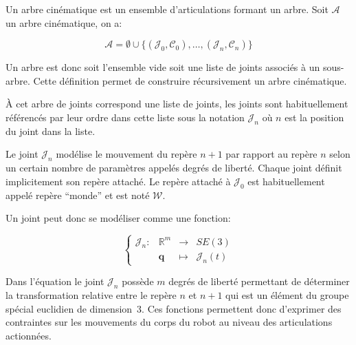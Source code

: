 \begin{mydef}
  Un arbre cinématique est un ensemble
  d'articulations
  formant un arbre. Soit $\mathcal{A}$ un arbre cinématique, on a:

  \begin{equation}
    \mathcal{A} = \emptyset \cup \{ (\mathcal{J}_0, \mathcal{C}_0),
    \dotsc, (\mathcal{J}_n, \mathcal{C}_n) \}
  \end{equation}

  Un arbre est donc soit l'ensemble vide soit une liste de joints
  associés à un sous-arbre. Cette définition permet de construire
  récursivement un arbre cinématique.

  À cet arbre de joints correspond une liste de joints, les joints
  sont habituellement référencés par leur ordre dans cette liste sous
  la notation $\mathcal{J}_n$ où $n$ est la position du joint dans la
  liste.
\end{mydef}

\begin{mydef}
  Le joint $\mathcal{J}_n$ modélise le mouvement du repère $n+1$ par
  rapport au repère $n$ selon un certain nombre de paramètres appelés
  degrés de liberté. Chaque joint définit implicitement son repère
  attaché. Le repère attaché à $\mathcal{J}_0$ est habituellement
  appelé repère ``monde'' et est noté $\mathcal{W}$.

  Un joint peut donc se modéliser comme une fonction:

  \begin{equation}
    \left\{
    \begin{array}{cccc}
      \mathcal{J}_n : & \mathbb{R}^m & \rightarrow & SE(3)\\
      & \mathbf{q} & \mapsto & \mathcal{J}_n(t)
    \end{array}
    \right.
  \end{equation}

  Dans l'équation le joint $\mathcal{J}_n$ possède $m$ degrés de
  liberté permettant de déterminer la transformation relative entre le
  repère $n$ et $n + 1$ qui est un élément du groupe spécial euclidien
  de dimension 3. Ces fonctions permettent donc d'exprimer des
  contraintes sur les mouvements du corps du robot au niveau des
  articulations actionnées.
\end{mydef}

